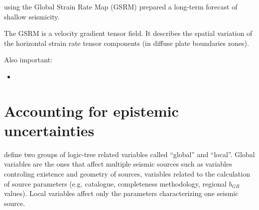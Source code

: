 \subsubsection{\cite{bird10}}
\cite{bird10} using the Global Strain Rate Map (GSRM) \citep{kreemer03} prepared a 
long-term forecast of shallow seismicity.  

The GSRM is a velocity gradient tensor field. It describes the  
spatial variation of the horizontal strain rate tensor components (in diffuse plate
boundaries zones).

Also important: 
\begin{itemize}
\item \cite{kagan2010}
\end{itemize}

%
\newpage
\section{Accounting for epistemic uncertainties}
\cite{coppersmith2009} define two groups of logic-tree related variables called 
``global'' and ``local''. Global variables are the ones that affect multiple 
seismic sources such as variables controling existence and geometry of sources,
variables related to the calculation of source parameters (e.g. catalogue, 
completeness methodology, regional $b_{GR}$ values). Local variables affect only
the parameters characterizing one seismic source.
